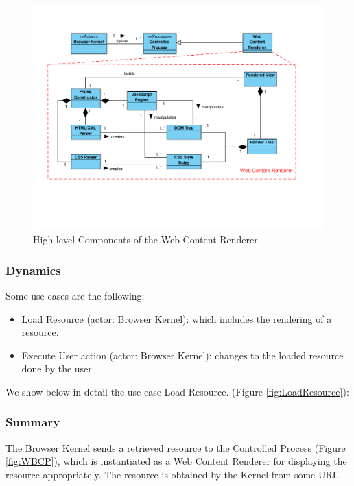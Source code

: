 \documentclass[]{acmlarge}
\begin{document}
    \begin{figure}[h!t]
      \vspace*{-1.5cm}
      \centering
      \hspace*{-0.4cm}\includegraphics[scale=0.57]{figures/WebContentRenderer-v4.pdf}
      \vspace*{-3cm}
      \caption{High-level Components of the Web Content Renderer.}
      \label{fig:WCR}
    \end{figure}

    \subsubsection*{Dynamics}
    Some use cases are the following:
    \begin{itemize}\leftskip2.5em
      \item Load Resource (actor: Browser Kernel): which includes the rendering of a resource.

      \item Execute User action (actor: Browser Kernel): changes to the loaded resource done by the user.

    \end{itemize}
    We show below in detail the use case Load Resource. (Figure \ref{fig:LoadResource}):
    \subsubsection*{Summary} The Browser Kernel sends a retrieved resource to the Controlled Process (Figure \ref{fig:WBCP}), which is instantiated as a Web Content Renderer for displaying the resource appropriately. The resource is obtained by the Kernel from some URL.
\end{document}
